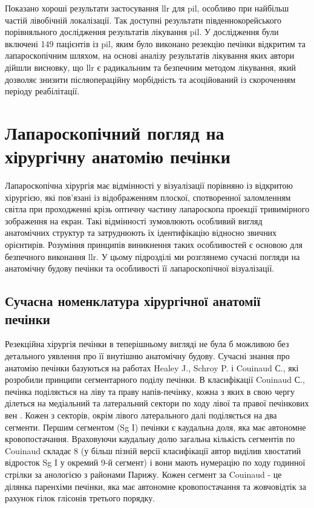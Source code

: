 \begin{refsection}
Показано хороші результати застосування \acrshort{llr} для \acrshort{pil}, особливо при найбільш частій лівобічній локалізації. Так доступні результати південнокорейського порівняльного дослідження результатів лікування \acrshort{pil}. У дослідження були включені 149 пацієнтів із \acrshort{pil}, яким було виконано резекцію печінки відкритим та лапароскопічним шляхом, на основі аналізу результатів лікування яких автори дійшли висновку, що \acrshort{llr} є радикальним та безпечним методом лікування, який дозволяє знизити післяопераційну морбідність та асоційований із скороченням періоду реабілітації.

\section{Лапароскопічний погляд на хірургічну анатомію печінки}

Лапароскопічна хірургія має відмінності у візуалізації порівняно із відкритою хірургією, які пов'язані із відображенням плоскої, спотворенної заломленням світла при проходженні крізь оптичну частину лапароскопа проекції тривимірного зображення на екран. Такі відмінності зумовлюють особливий вигляд анатомічних структур та затруднюють їх ідентифікацію відносно звичних орієнтирів. Розуміння принципів виникнення таких особливостей є основою для безпечного виконання \acrshort{llr}. У цьому підрозділі ми розглянемо сучасні погляди на анатомічну будову печінки та особливості її лапароскопічної візуалізації.

\subsection{Сучасна номенклатура хірургічної анатомії печінки}

Резекційна хірургія печінки в теперішньому вигляді не була б можливою без детального уявлення про її внутішню анатомічну будову. Сучасні знання про анатомію печінки базуються на работах Healey J., Schroy P. і Couinaud С., які розробили принципи сегментарного поділу печінки. В класифікації Couinaud С., печінка поділяється на ліву та праву напів-печінку, кожна з яких в свою чергу ділеться на медіальний та латеральний сектори по ходу лівої та правої печінкових вен \cite{COUINAUD1954}. Кожен з секторів, окрім лівого латерального далі поділяється на два сегменти. Першим сегментом (Sg I) печінки є каудальна доля, яка має автономне кровопостачання. Враховуючи каудальну долю загальна кількість сегментів по Couinaud складає 8 (у більш пізній версії класифікації автор виділив хвостатий відросток Sg I у окремий 9-й сегмент) і вони мають нумерацію по ходу годинної стрілки за анологією з районами Парижу. Кожен сегмент за Couinaud - це ділянка паренхіми печінки, яка має автономне кровопостачання та жовчовідтік за рахунок гілок глісонів третього порядку. 


\end{refsection}
